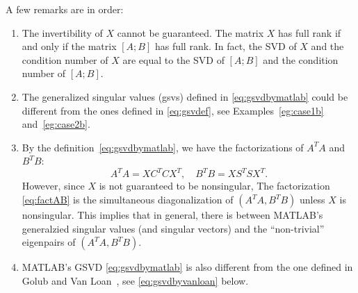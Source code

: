 \noindent A few remarks are in order: 
\begin{enumerate} 
\item The invertibility of $X$ cannot be guaranteed. 
The matrix $X$ has full rank if and only if the matrix 
$[A;  B]$ has full rank. 
In fact, the SVD of $X$ and the condition number of $X$ 
are equal to the SVD of $[A; B]$ and the condition number of $[A; B]$. 

\item The generalized singular values (gsvs) defined
in \eqref{eq:gsvdbymatlab} could be different from the ones 
defined in \eqref{eq:gsvdef}, 
see Examples~\ref{eg:case1b} and~\ref{eg:case2b}. 

\item By the definition~\eqref{eq:gsvdbymatlab}, we have  
the factorizations of $A^TA$ and $B^TB$: 
\begin{equation} \label{eq:factAB}
A^T A = X C^T C X^T, \quad
B^T B = X S^T S X^T. 
\end{equation} 
However, since $X$ is not guaranteed to be nonsingular, 
The factorization \eqref{eq:factAB} is  the simultaneous
diagonalization of $(A^TA, B^TB)$ unless $X$ is nonsingular. 
This implies that in general, there is 
between MATLAB's generalzied singular values (and singular vectors) 
and the ``non-trivial'' eigenpairs of $(A^TA, B^TB)$. 


\item MATLAB's GSVD \eqref{eq:gsvdbymatlab}  is
also different from the one defined in 
Golub and Van Loan~\cite[pp.~309]{golub2013matrix}, 
see \eqref{eq:gsvdbyvanloan} below. 
        
\end{enumerate} 


\newpage 
